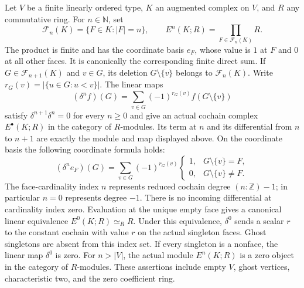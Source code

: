 \begin{lemma}\label{lem:augmented-cochain-complex}
\leanok
Let $V$ be a finite linearly ordered type, $K$ an augmented complex on
$V$, and $R$ any commutative ring. For $n\in\mathbb N$, set
\[
 \mathcal F_n(K)=\{F\in K:|F|=n\},\qquad
 E^n(K;R)=\prod_{F\in\mathcal F_n(K)}R.
\]
The product is finite and has the coordinate basis $e_F$, whose value is
$1$ at $F$ and $0$ at all other faces. It is canonically the corresponding
finite direct sum. If $G\in\mathcal F_{n+1}(K)$ and $v\in G$, its deletion
$G\setminus\{v\}$ belongs to $\mathcal F_n(K)$. Write
$r_G(v)=|\{u\in G:u<v\}|$. The linear maps
\[
 (\delta^n f)(G)=\sum_{v\in G}(-1)^{r_G(v)}
                         f(G\setminus\{v\})
\]
satisfy $\delta^{n+1}\delta^n=0$ for every $n\geq0$ and give an actual
cochain complex $E^\bullet(K;R)$ in the category of $R$-modules. Its term
at $n$ and its differential from $n$ to $n+1$ are exactly the module and
map displayed above. On the coordinate basis the following coordinate
formula holds:
\[
 (\delta^n e_F)(G)=\sum_{v\in G}(-1)^{r_G(v)}
       \begin{cases}
        1,&G\setminus\{v\}=F,\\
        0,&G\setminus\{v\}\ne F.
       \end{cases}
\]
The face-cardinality index $n$ represents reduced cochain degree
$(n:\mathbb Z)-1$; in particular $n=0$ represents degree $-1$.
There is no incoming differential at cardinality index zero. Evaluation at the
unique empty face gives a canonical linear equivalence $E^0(K;R)\simeq_R R$.
Under this equivalence, $\delta^0$ sends a scalar $r$ to the constant
cochain with value $r$ on the actual singleton faces. Ghost singletons
are absent from this index set. If every singleton is a nonface, the linear
map $\delta^0$ is zero. For $n>|V|$, the actual module $E^n(K;R)$ is a
zero object in the category of $R$-modules. These assertions include empty
$V$, ghost vertices, characteristic two, and the zero coefficient ring.
\end{lemma}
